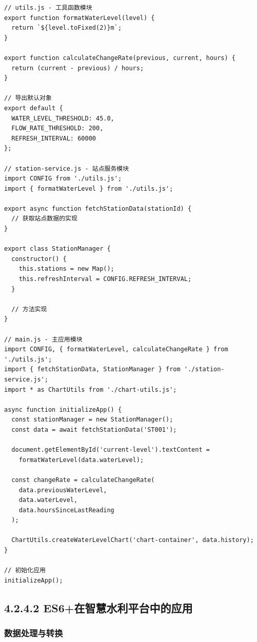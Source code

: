 \begin{lstlisting}
// utils.js - 工具函数模块
export function formatWaterLevel(level) {
  return `${level.toFixed(2)}m`;
}

export function calculateChangeRate(previous, current, hours) {
  return (current - previous) / hours;
}

// 导出默认对象
export default {
  WATER_LEVEL_THRESHOLD: 45.0,
  FLOW_RATE_THRESHOLD: 200,
  REFRESH_INTERVAL: 60000
};

// station-service.js - 站点服务模块
import CONFIG from './utils.js';
import { formatWaterLevel } from './utils.js';

export async function fetchStationData(stationId) {
  // 获取站点数据的实现
}

export class StationManager {
  constructor() {
    this.stations = new Map();
    this.refreshInterval = CONFIG.REFRESH_INTERVAL;
  }
  
  // 方法实现
}

// main.js - 主应用模块
import CONFIG, { formatWaterLevel, calculateChangeRate } from './utils.js';
import { fetchStationData, StationManager } from './station-service.js';
import * as ChartUtils from './chart-utils.js';

async function initializeApp() {
  const stationManager = new StationManager();
  const data = await fetchStationData('ST001');
  
  document.getElementById('current-level').textContent = 
    formatWaterLevel(data.waterLevel);
    
  const changeRate = calculateChangeRate(
    data.previousWaterLevel, 
    data.waterLevel, 
    data.hoursSinceLastReading
  );
  
  ChartUtils.createWaterLevelChart('chart-container', data.history);
}

// 初始化应用
initializeApp();
\end{lstlisting}

\subsection{4.2.4.2
ES6+在智慧水利平台中的应用}\label{es6ux5728ux667aux6167ux6c34ux5229ux5e73ux53f0ux4e2dux7684ux5e94ux7528}

\subsubsection{数据处理与转换}\label{ux6570ux636eux5904ux7406ux4e0eux8f6cux6362}

